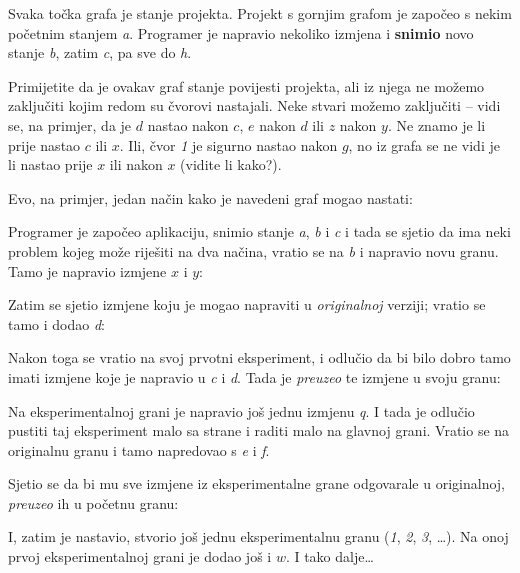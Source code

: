

Svaka točka grafa je stanje projekta. 
Projekt s gornjim grafom je započeo s nekim početnim stanjem \emph a.
Programer je napravio nekoliko izmjena i \textbf{snimio} novo stanje \emph b, zatim \emph c, pa sve do \emph h.

Primijetite da je ovakav graf stanje povijesti projekta, ali iz njega ne možemo zaključiti kojim redom su čvorovi nastajali.
Neke stvari možemo zaključiti -- vidi se, na primjer, da je $d$ nastao nakon $c$, $e$ nakon $d$ ili $z$ nakon $y$.
Ne znamo je li prije nastao $c$ ili $x$.
Ili, čvor \emph 1 je sigurno nastao nakon $g$, no iz grafa se ne vidi je li nastao prije $x$ ili nakon $x$ (vidite li kako?).

Evo, na primjer, jedan način kako je navedeni graf mogao nastati:



Programer je započeo aplikaciju, snimio stanje \emph a, \emph b i \emph c i tada se sjetio da ima neki problem kojeg može riješiti na dva načina, vratio se na \emph b i napravio novu granu. Tamo je napravio izmjene $x$ i $y$:



Zatim se sjetio izmjene koju je mogao napraviti u \emph{originalnoj} verziji; vratio se tamo i dodao \emph d:



Nakon toga se vratio na svoj prvotni eksperiment, i odlučio da bi bilo dobro tamo imati izmjene koje je napravio u \emph c i \emph d.
Tada je \emph{preuzeo} te izmjene u svoju granu:



Na eksperimentalnoj grani je napravio još jednu izmjenu \emph q.
I tada je odlučio pustiti taj eksperiment malo sa strane i raditi malo na glavnoj grani.
Vratio se na originalnu granu i tamo napredovao s \emph e i \emph f. 



Sjetio se da bi mu sve izmjene iz eksperimentalne grane odgovarale u originalnoj, \emph{preuzeo} ih u početnu granu:



I, zatim je nastavio, stvorio još jednu eksperimentalnu granu (\emph 1, \emph 2, \emph 3, \dots).
Na onoj prvoj eksperimentalnoj grani je dodao još i $w$. I tako dalje\dots

